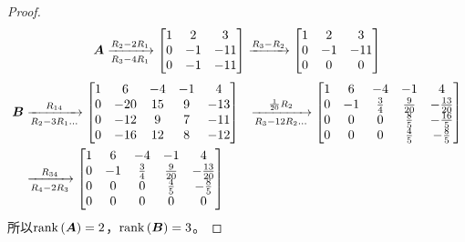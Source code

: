 \begin{proof}
    \begin{equation*}
        \boldsymbol{A}\xrightarrow[R_3-4R_1]{R_2-2R_1}
        \begin{bmatrix}
            1 & 2  & 3   \\
            0 & -1 & -11 \\
            0 & -1 & -11
        \end{bmatrix}\xrightarrow{R_3-R_2}
        \begin{bmatrix}
            1 & 2  & 3   \\
            0 & -1 & -11 \\
            0 & 0  & 0
        \end{bmatrix}
    \end{equation*}
    \begin{align*}
        \boldsymbol{B} & \xrightarrow[R_2-3R_1\dots]{R_{14}}
        \begin{bmatrix}
            1 & 6   & -4 & -1 & 4   \\
            0 & -20 & 15 & 9  & -13 \\
            0 & -12 & 9  & 7  & -11 \\
            0 & -16 & 12 & 8  & -12
        \end{bmatrix}
              & \xrightarrow[R_3-12R_2\dots]{\frac{1}{20}R_2}
        \begin{bmatrix}
            1 & 6  & -4          & -1           & 4              \\
            0 & -1 & \frac{3}{4} & \frac{9}{20} & -\frac{13}{20} \\
            0 & 0  & 0           & \frac{8}{5}  & -\frac{16}{5}  \\
            0 & 0  & 0           & \frac{4}{5}  & -\frac{8}{5}
        \end{bmatrix}  \\
              & \xrightarrow[R_4-2R_3]{R_{34}}
        \begin{bmatrix}
            1 & 6  & -4          & -1           & 4              \\
            0 & -1 & \frac{3}{4} & \frac{9}{20} & -\frac{13}{20} \\
            0 & 0  & 0           & \frac{4}{5}  & -\frac{8}{5}   \\
            0 & 0  & 0           & 0            & 0
        \end{bmatrix}
    \end{align*}
    所以\(\mathrm{rank}\left( \boldsymbol{A} \right)=2\)，\(\mathrm{rank}\left( \boldsymbol{B} \right)=3\)。
\end{proof}

